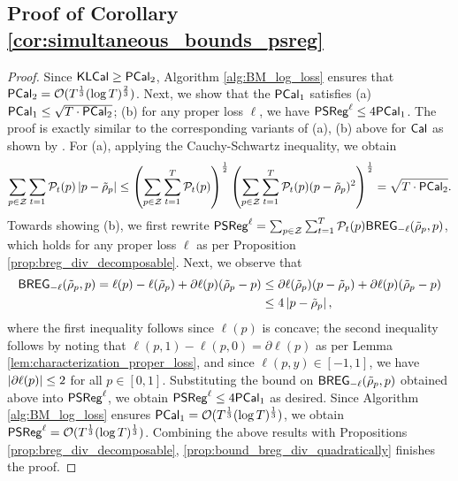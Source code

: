 \subsection{Proof of Corollary \ref{cor:simultaneous_bounds_psreg}}
\begin{proof}
     Since $\kcal \ge \pcal_{2}$, Algorithm \ref{alg:BM_log_loss} ensures that $\pcal_{2} = \cO(T^{\frac{1}{3}} (\log T) ^ {\frac{2}{3}})$. Next, we show that the  $\pcal_{1}$ satisfies (a) $\pcal_{1} \le \sqrt{T \cdot \pcal_{2}}$; (b) for any proper loss $\ell$, we have $\psreg^{\ell} \le 4\pcal_{1}$. The proof is exactly similar to the corresponding variants of (a), (b) above for $\cal$ as shown by  \cite{kleinberg2023u}. For (a), applying the Cauchy-Schwartz inequality, we obtain \begin{align*}
        \sum_{p \in \cZ} \sum_{t = 1} \cP_{t}(p)\abs{p - \tilde{\rho}_{p}} \le \bigc{\sum_{p \in \cZ} \sum_{t = 1} ^ {T} \cP_{t}(p)} ^ {\frac{1}{2}} \bigc{\sum_{p \in \cZ} \sum_{t = 1} ^ {T} \cP_{t}(p) (p - \tilde{\rho}_{p}) ^ {2}} ^ {\frac{1}{2}} = \sqrt{T \cdot \pcal_{2}}.
    \end{align*}
    Towards showing (b), we first rewrite $\psreg^{\ell} = \sum_{p \in \cZ} \sum_{t = 1} ^ {T} \cP_{t}(p) \breg_{-\ell}(\tilde{\rho}_{p}, p)$, which holds for any proper loss $\ell$ as per Proposition \ref{prop:breg_div_decomposable}. Next, we observe that \begin{align*}
        \breg_{-\ell}(\tilde{\rho}_{p}, p) =  \ell(p) -\ell(\tilde{\rho}_{p}) + \partial \ell (p) (\tilde{\rho}_{p} - p) &\le \partial \ell(\tilde{\rho}_{p}) (p - \tilde{\rho}_{p}) + \partial \ell(p) (\tilde{\rho}_{p} - p) \\
        &\le 4 \abs{p - \tilde{\rho}_{p}},
    \end{align*}
    where the first inequality follows since $\ell(p)$ is concave; the second inequality follows by noting that $\ell(p, 1) - \ell(p, 0) = \partial \ell (p)$ as per Lemma \ref{lem:characterization_proper_loss}, and since $\ell(p, y) \in [-1, 1]$, we have $\abs{\partial \ell (p)} \le 2$ for all $p \in [0, 1]$. Substituting the bound on $\breg_{-\ell}(\tilde{\rho}_p, p)$ obtained above into $\psreg^{\ell}$, we obtain $\psreg^{\ell} \le 4\pcal_{1}$ as desired. Since Algorithm \ref{alg:BM_log_loss} ensures $\pcal_{1} = \cO(T^{\frac{1}{3}} (\log T) ^ {\frac{1}{3}})$, we obtain $\psreg^{\ell} = \cO(T^{\frac{1}{3}} (\log T) ^ {\frac{1}{3}})$. Combining the above results with Propositions \ref{prop:breg_div_decomposable}, \ref{prop:bound_breg_div_quadratically} finishes the proof.
\end{proof}
